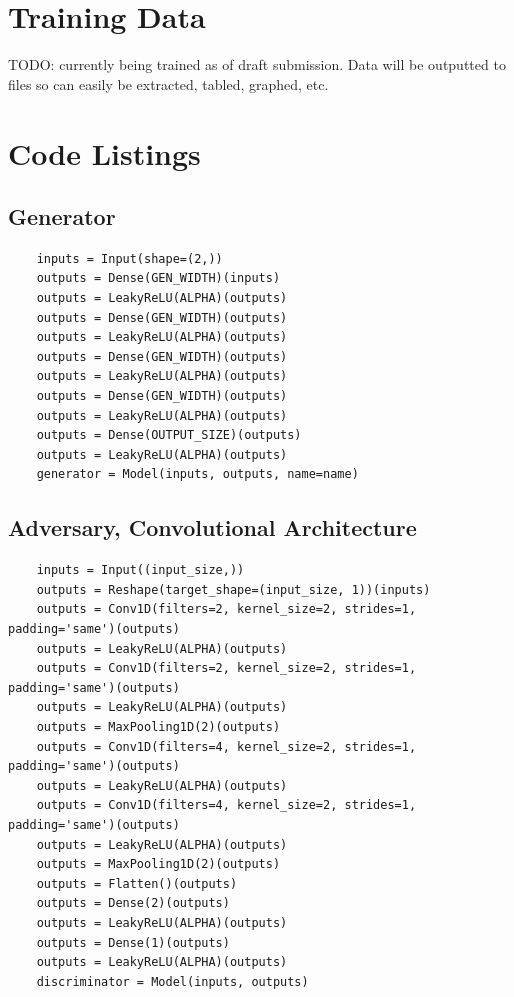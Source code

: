 \documentclass[12pt, titlepage]{report}
\theoremstyle{definition}
\begin{document}
\appendix
\chapter{Training Data}
TODO: currently being trained as of draft submission. Data will be outputted to files so can easily be extracted, tabled, graphed, etc.

\chapter{Code Listings}
\section{Generator}\label{appendix:generator}
\begin{verbatim}
    inputs = Input(shape=(2,))
    outputs = Dense(GEN_WIDTH)(inputs)
    outputs = LeakyReLU(ALPHA)(outputs)
    outputs = Dense(GEN_WIDTH)(outputs)
    outputs = LeakyReLU(ALPHA)(outputs)
    outputs = Dense(GEN_WIDTH)(outputs)
    outputs = LeakyReLU(ALPHA)(outputs)
    outputs = Dense(GEN_WIDTH)(outputs)
    outputs = LeakyReLU(ALPHA)(outputs)
    outputs = Dense(OUTPUT_SIZE)(outputs)
    outputs = LeakyReLU(ALPHA)(outputs)
    generator = Model(inputs, outputs, name=name)
\end{verbatim} 

\section{Adversary, Convolutional Architecture}\label{appendix:convolutional}
\begin{verbatim}
    inputs = Input((input_size,))
    outputs = Reshape(target_shape=(input_size, 1))(inputs)
    outputs = Conv1D(filters=2, kernel_size=2, strides=1, padding='same')(outputs)
    outputs = LeakyReLU(ALPHA)(outputs)
    outputs = Conv1D(filters=2, kernel_size=2, strides=1, padding='same')(outputs)
    outputs = LeakyReLU(ALPHA)(outputs)
    outputs = MaxPooling1D(2)(outputs)
    outputs = Conv1D(filters=4, kernel_size=2, strides=1, padding='same')(outputs)
    outputs = LeakyReLU(ALPHA)(outputs)
    outputs = Conv1D(filters=4, kernel_size=2, strides=1, padding='same')(outputs)
    outputs = LeakyReLU(ALPHA)(outputs)
    outputs = MaxPooling1D(2)(outputs)
    outputs = Flatten()(outputs)
    outputs = Dense(2)(outputs)
    outputs = LeakyReLU(ALPHA)(outputs)
    outputs = Dense(1)(outputs)
    outputs = LeakyReLU(ALPHA)(outputs)
    discriminator = Model(inputs, outputs)
\end{verbatim}
\end{document}

